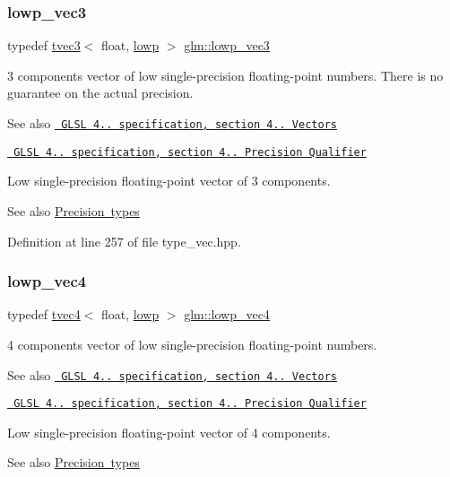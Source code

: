\subsubsection{\texorpdfstring{lowp\_vec3}{lowp\_vec3}}
{\footnotesize\ttfamily typedef \mbox{\hyperlink{structglm_1_1tvec3}{tvec3}}$<$ float, \mbox{\hyperlink{namespaceglm_a0f04f086094c747d227af4425893f545ae161af3fc695e696ce3bf69f7332bc2d}{lowp}} $>$ \mbox{\hyperlink{group__core__precision_ga0229a1c4abd7c51f15eeb7a0fec3846b}{glm\+::lowp\+\_\+vec3}}}

3 components vector of low single-\/precision floating-\/point numbers. There is no guarantee on the actual precision.

\begin{DoxySeeAlso}{See also}
\href{http://www.opengl.org/registry/doc/GLSLangSpec.4.20.8.pdf}{\texttt{ G\+L\+SL 4.. specification, section 4.. Vectors}} 

\href{http://www.opengl.org/registry/doc/GLSLangSpec.4.20.8.pdf}{\texttt{ G\+L\+SL 4.. specification, section 4.. Precision Qualifier}}
\end{DoxySeeAlso}
Low single-\/precision floating-\/point vector of 3 components. \begin{DoxySeeAlso}{See also}
\mbox{\hyperlink{group__core__precision}{Precision types}} 
\end{DoxySeeAlso}


Definition at line 257 of file type\+\_\+vec.\+hpp.

\mbox{\label{group__core__precision_gabb82786cbefa101e9eb0cff63cecb1f2}} 
\subsubsection{\texorpdfstring{lowp\_vec4}{lowp\_vec4}}
{\footnotesize\ttfamily typedef \mbox{\hyperlink{structglm_1_1tvec4}{tvec4}}$<$ float, \mbox{\hyperlink{namespaceglm_a0f04f086094c747d227af4425893f545ae161af3fc695e696ce3bf69f7332bc2d}{lowp}} $>$ \mbox{\hyperlink{group__core__precision_gabb82786cbefa101e9eb0cff63cecb1f2}{glm\+::lowp\+\_\+vec4}}}

4 components vector of low single-\/precision floating-\/point numbers.

\begin{DoxySeeAlso}{See also}
\href{http://www.opengl.org/registry/doc/GLSLangSpec.4.20.8.pdf}{\texttt{ G\+L\+SL 4.. specification, section 4.. Vectors}} 

\href{http://www.opengl.org/registry/doc/GLSLangSpec.4.20.8.pdf}{\texttt{ G\+L\+SL 4.. specification, section 4.. Precision Qualifier}}
\end{DoxySeeAlso}
Low single-\/precision floating-\/point vector of 4 components. \begin{DoxySeeAlso}{See also}
\mbox{\hyperlink{group__core__precision}{Precision types}} 
\end{DoxySeeAlso}


